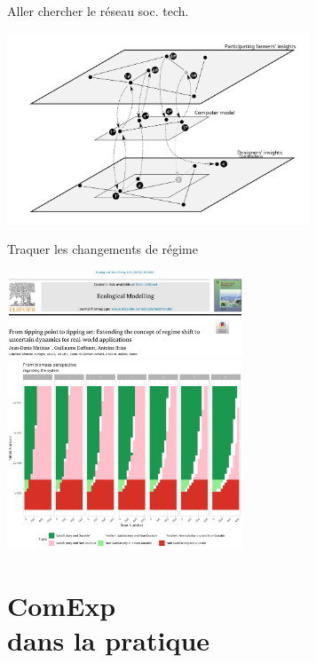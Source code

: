 \documentclass[newPxFont]{beamer}
\begin{document}
\begin{frame}[c]{Aller chercher le réseau soc. tech.}
  \vspace{-1cm}
\begin{center}
  \includegraphics[width=9cm]{img/fig-construction-elements-jeu-beneficiaire_eng}
\end{center}
\end{frame}


\begin{frame}[c]{Traquer les changements de régime}
  \vspace{-1cm}
  \begin{center}
    \includegraphics[width=7cm]{img/2024mathias.png}\\
    \includegraphics[width=7cm]{img/m0_pse_fatisfaction_mathias_biomass.png}
   \end{center}
\end{frame}



\section{ComExp\\ dans la pratique}
\end{document}
